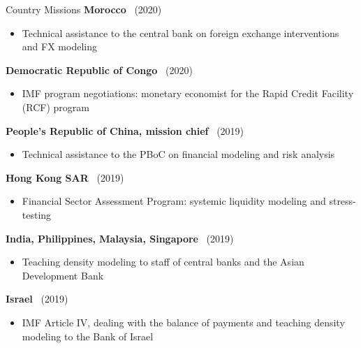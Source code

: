 \documentclass[usegeometry, 10pt, a4paper]{cv} %
\newcommand{\activite}[1]{\textbf{#1}\ }
\newcommand{\midreduce}{-0.5cm}
\begin{document}
\begin{rubriquetableau}[0.95\textwidth]{Country Missions}
  \activite{Morocco} (2020)\\
  \vspace{\midreduce}
  \begin{itemize}[label={}]
    \item \small{Technical assistance to the central bank on foreign exchange
        interventions and FX modeling}
  \end{itemize}

  \activite{Democratic Republic of Congo} (2020)\\
  \vspace{\midreduce}
  \begin{itemize}[label={}]
    \item \small{IMF program negotiations: monetary economist for the Rapid
        Credit Facility (RCF) program}
  \end{itemize}

  \activite{People's Republic of China, mission chief} (2019)\\
  \vspace{\midreduce}
  \begin{itemize}[label={}]
    \item \small{Technical assistance to the PBoC on financial modeling and
        risk analysis}
  \end{itemize}
  
  \activite{Hong Kong SAR} (2019)\\
  \vspace{\midreduce}
  \begin{itemize}[label={}]
    \item \small{Financial Sector Assessment Program: systemic liquidity modeling and stress-testing}
  \end{itemize}

  \activite{India, Philippines, Malaysia, Singapore} (2019)\\
  \vspace{\midreduce}
  \begin{itemize}[label={}]
    \item \small{Teaching density modeling to staff of central banks and the Asian Development Bank}
  \end{itemize}

  \activite{Israel} (2019)\\
  \vspace{\midreduce}
  \begin{itemize}[label={}]
    \item \small{IMF Article IV, dealing with the balance of payments and teaching density modeling to the Bank of Israel}
  \end{itemize}


\end{rubriquetableau}
\end{document}

